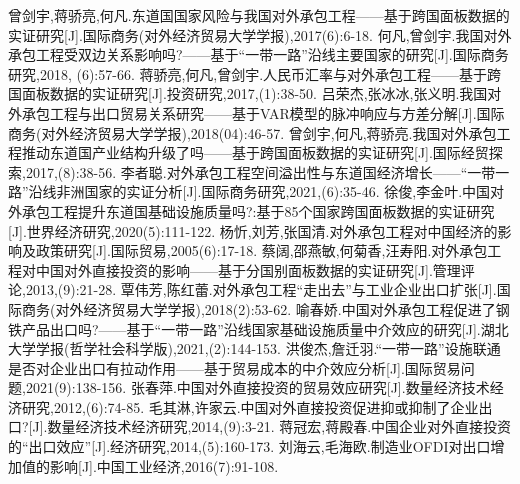 \documentclass[a4paper,12pt]{article}
\begin{document}



\begin{thebibliography}{99}  
			曾剑宇,蒋骄亮,何凡.东道国国家风险与我国对外承包工程——基于跨国面板数据的实证研究[J].国际商务(对外经济贸易大学学报),2017(6):6-18.
			何凡,曾剑宇.我国对外承包工程受双边关系影响吗?——基于“一带一路”沿线主要国家的研究[J].国际商务研究,2018, (6):57-66.
			蒋骄亮,何凡,曾剑宇.人民币汇率与对外承包工程——基于跨国面板数据的实证研究[J].投资研究,2017,(1):38-50.
			吕荣杰,张冰冰,张义明.我国对外承包工程与出口贸易关系研究——基于VAR模型的脉冲响应与方差分解[J].国际商务(对外经济贸易大学学报),2018(04):46-57.
			曾剑宇,何凡,蒋骄亮.我国对外承包工程推动东道国产业结构升级了吗——基于跨国面板数据的实证研究[J].国际经贸探索,2017,(8):38-56.
			李者聪.对外承包工程空间溢出性与东道国经济增长——“一带一路”沿线非洲国家的实证分析[J].国际商务研究,2021,(6):35-46.
			徐俊,李金叶.中国对外承包工程提升东道国基础设施质量吗?:基于85个国家跨国面板数据的实证研究[J].世界经济研究,2020(5):111-122.
			杨忻,刘芳,张国清.对外承包工程对中国经济的影响及政策研究[J].国际贸易,2005(6):17-18.
			蔡阔,邵燕敏,何菊香,汪寿阳.对外承包工程对中国对外直接投资的影响——基于分国别面板数据的实证研究[J].管理评论,2013,(9):21-28.
			覃伟芳,陈红蕾.对外承包工程“走出去”与工业企业出口扩张[J].国际商务(对外经济贸易大学学报),2018(2):53-62.
			喻春娇.中国对外承包工程促进了钢铁产品出口吗?——基于“一带一路”沿线国家基础设施质量中介效应的研究[J].湖北大学学报(哲学社会科学版),2021,(2):144-153.
			洪俊杰,詹迁羽.“一带一路”设施联通是否对企业出口有拉动作用——基于贸易成本的中介效应分析[J].国际贸易问题,2021(9):138-156.
			张春萍.中国对外直接投资的贸易效应研究[J].数量经济技术经济研究,2012,(6):74-85.
			毛其淋,许家云.中国对外直接投资促进抑或抑制了企业出口?[J].数量经济技术经济研究,2014,(9):3-21.
			蒋冠宏,蒋殿春.中国企业对外直接投资的“出口效应”[J].经济研究,2014,(5):160-173.
			刘海云,毛海欧.制造业OFDI对出口增加值的影响[J].中国工业经济,2016(7):91-108.
\end{thebibliography}

	
\end{document}
